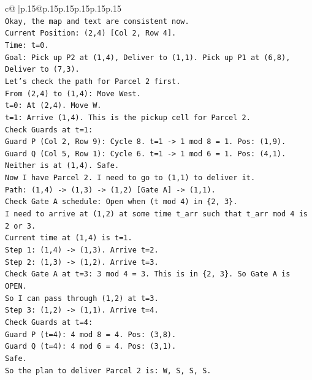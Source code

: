 \documentclass{article}
\begin{document}
{\begin{supertabular}{c@{$\;$}|p{.15\linewidth}@{}p{.15\linewidth}p{.15\linewidth}p{.15\linewidth}p{.15\linewidth}p{.15\linewidth}}
{{{\\ 
\texttt{Okay, the map and text are consistent now.} \\
\texttt{Current Position: (2,4) {[}Col 2, Row 4{]}.} \\
\texttt{Time: t=0.} \\
\texttt{Goal: Pick up P2 at (1,4), Deliver to (1,1). Pick up P1 at (6,8), Deliver to (7,3).} \\
\texttt{Let's check the path for Parcel 2 first.} \\
\texttt{From (2,4) to (1,4): Move West.} \\
\texttt{t=0: At (2,4). Move W.} \\
\texttt{t=1: Arrive (1,4). This is the pickup cell for Parcel 2.} \\
\texttt{Check Guards at t=1:} \\
\texttt{Guard P (Col 2, Row 9): Cycle 8. t=1 {-}> 1 mod 8 = 1. Pos: (1,9).} \\
\texttt{Guard Q (Col 5, Row 1): Cycle 6. t=1 {-}> 1 mod 6 = 1. Pos: (4,1).} \\
\texttt{Neither is at (1,4). Safe.} \\
\texttt{Now I have Parcel 2. I need to go to (1,1) to deliver it.} \\
\texttt{Path: (1,4) {-}> (1,3) {-}> (1,2) {[}Gate A{]} {-}> (1,1).} \\
\texttt{Check Gate A schedule: Open when (t mod 4) in \{2, 3\}.} \\
\texttt{I need to arrive at (1,2) at some time t\_arr such that t\_arr mod 4 is 2 or 3.} \\
\texttt{Current time at (1,4) is t=1.} \\
\texttt{Step 1: (1,4) {-}> (1,3). Arrive t=2.} \\
\texttt{Step 2: (1,3) {-}> (1,2). Arrive t=3.} \\
\texttt{Check Gate A at t=3: 3 mod 4 = 3. This is in \{2, 3\}. So Gate A is OPEN.} \\
\texttt{So I can pass through (1,2) at t=3.} \\
\texttt{Step 3: (1,2) {-}> (1,1). Arrive t=4.} \\
\texttt{Check Guards at t=4:} \\
\texttt{Guard P (t=4): 4 mod 8 = 4. Pos: (3,8).} \\
\texttt{Guard Q (t=4): 4 mod 6 = 4. Pos: (3,1).} \\
\texttt{Safe.} \\
\texttt{So the plan to deliver Parcel 2 is: W, S, S, S.} \\
}}}
\end{supertabular}}
\end{document}
